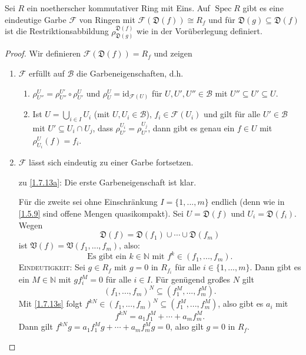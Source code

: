 \documentclass[a4paper,12pt,index=toc]{scrbook}
\theoremstyle{keinenummern} %
\def\V{\mathfrak{V}}
\newcommand{\D}{\mathfrak{D}}
\def\B{\mathcal{B}}
\newcommand{\F}{\mathcal{F}}
\newcommand{\Spec}{\operatorname{Spec}}
\newcommand{\id}{\mathrm{id}}
\renewcommand{\dotsc}{\ensuremath{\!...}}
\newcommand{\set}[1]{\ensuremath{\mathbb{#1}}}
\newcommand{\N}{\set{N}}
\begin{document}
\begin{prop}\label{1.7.13}
  Sei $R$ ein noetherscher kommutativer Ring mit Eins.
  Auf $\Spec R$ gibt es eine eindeutige Garbe $\F$ von Ringen mit $\F(\D(f))\cong R_f$ und für $\D(g)\subseteq
  \D(f)$ ist die Restriktionsabbildung $\rho_{\D(g)}^{\D(f)}$ wie in der Vorüberlegung definiert.
\end{prop}
\begin{proof}
  Wir definieren $\F(\D(f))=R_f$ und zeigen
  \begin{enumerate}
  \item{} $\F$ erfüllt auf $\B$ die Garbeneigenschaften, d.h.
    \begin{enumerate}[label=(\textsc{g}\arabic*)]
    \item\label{G1} $\rho_{U''}^U=\rho_{U''}^{U'}\circ\rho_{U'}^U$ und $\rho_U^U=\id_{\F(U)}$ für
      $U,U',U''\in\B$ mit $U''\subseteq U'\subseteq U$.
    \item\label{G2} Ist $U=\bigcup_{i\in I}U_i$ (mit $U,U_i\in\B$), $f_i\in\F(U_i)$ und gilt für alle
      $U'\in\B$ mit $U'\subseteq U_i\cap U_j$, dass $\rho_{U'}^{U_i}=\rho_{U'}^{U_j}$, dann gibt es genau ein
      $f\in U$ mit $\rho_{U_i}^U(f)=f_i$.
    \end{enumerate}
  \item{} $\F$ lässt sich eindeutig zu einer Garbe fortsetzen.
  \end{enumerate}
  \begin{enumerate}
  \item[zu] \ref{1.7.13a}: Die erste Garbeneigenschaft ist klar. 
  
  Für die zweite sei ohne Einschränkung $I=\{1,\dotsc,m\}$ endlich
    (denn wie in \cref{1.5.9} sind offene Mengen quasikompakt). Sei $U=\D(f)$ und $U_i=\D(f_i)$. Wegen
    \[\D(f)=\D(f_1)\cup\dotsm\cup \D(f_m)\] ist $\V(f)=\V(f_1,\dotsc,f_m)$, also: 
    \begin{equation}\label{1.7.13s}\text{Es gibt ein }k\in\N\text{ mit }f^k\in(f_1,\dotsc,f_m).\tag{$*$}\end{equation}
%
    \textsc{Eindeutigkeit}: Sei $g\in R_f$ mit $g=0$ in $R_{f_i}$ für alle $i\in\{1,\dotsc,m\}$. Dann gibt es ein $M\in\N$ mit
    $gf_i^M=0$ für alle $i\in I$. Für genügend großes $N$ gilt 
    \[(f_1,\dotsc,f_m)^N\subseteq(f_1^M,\dotsc,f_m^M).\] 
    Mit \cref{1.7.13s}
    folgt $f^{kN}\in(f_1,\dotsc,f_m)^N\subseteq(f_1^M,\dotsc,f_m^M)$, also gibt es $a_i$ mit
    \[f^{kN}=a_1f_1^M+\dotsm+a_mf_m^M.\]
    Dann gilt $f^{kN}g=a_1f_1^Mg+\dotsm+a_mf_m^Mg=0$, also gilt $g=0$ in $R_f$.


\end{enumerate}
\end{proof}
\end{document}
